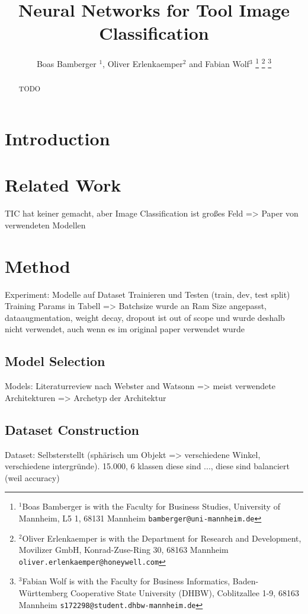\documentclass[a4paper, 10pt, journal]{wissarbIEEE}
\title{\LARGE \bf Neural Networks for Tool Image Classification}
\author{Boas Bamberger $^{1}$, Oliver Erlenkaemper$^{2}$ and Fabian Wolf$^{3}$ 
\thanks{$^{1}$Boas Bamberger is with the Faculty for Business Studies, University of  Mannheim, L5 1, 68131 Mannheim {\tt\small bamberger@uni-mannheim.de}} \thanks{$^{2}$Oliver Erlenkaemper is with the Department for Research and Development, Movilizer GmbH, Konrad-Zuse-Ring 30, 68163 Mannheim {\tt\small oliver.erlenkaemper@honeywell.com}} \thanks{$^{3}$Fabian Wolf is with the Faculty for Business Informatics, Baden-Württemberg Cooperative State University (DHBW), Coblitzallee 1-9, 68163 Mannheim {\tt\small s172298@student.dhbw-mannheim.de}}
}
\begin{document}
\maketitle
\begin{abstract}
TODO
\end{abstract}

\section{Introduction}

\section{Related Work}
TIC hat keiner gemacht, aber Image Classification ist großes Feld => Paper von verwendeten Modellen

\section{Method}
\label{sec:method}
Experiment: Modelle auf Dataset Trainieren und Testen (train, dev, test split)
Training Params in Tabell => Batchsize wurde an Ram Size angepasst, dataaugmentation, weight decay, dropout ist out of scope und wurde deshalb nicht verwendet, auch wenn es im original paper verwendet wurde
\subsection{Model Selection}
Models: Literaturreview nach Webster and Watsonn => meist verwendete Architekturen => Archetyp der Architektur
\subsection{Dataset Construction}
Dataset: Selbsterstellt (sphärisch um Objekt => verschiedene Winkel, verschiedene intergründe). 15.000, 6 klassen diese sind ..., diese sind balanciert (weil accuracy)
\end{document}
